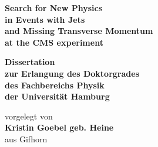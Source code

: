 \documentclass[
twoside=true,
headsepline,     %
headings=normal,
open=right,
numbers=noenddot, %
a4paper
]{scrreprt} %
\author{Matthias Schr\"oder}
\begin{document}
\begin{titlepage}
  \begin{center}
    \thispagestyle{empty}
    \vspace*{1cm}
    \begin{doublespace} 
      \textbf{\huge Search for New Physics}\\
      \textbf{\huge in Events with Jets}\\
      \textbf{\huge and Missing Transverse Momentum}\\
      \textbf{\huge at the CMS experiment} \\
      \vskip1.5cm
      \begin{Large} 
        \textbf{Dissertation\\
          zur Erlangung des Doktorgrades\\
          des Fachbereichs Physik\\
          der Universit\"{a}t Hamburg\\}
      \end{Large}
      \vskip2cm
      \begin{large}
        vorgelegt von\\
        {\bf Kristin Goebel geb. Heine}\\
        aus Gifhorn
        \vfill
      \end{large}
    \end{doublespace} 
  \end{center}
\end{titlepage}


\newpage 
\thispagestyle{empty}
\quad 
\newpage
\thispagestyle{empty}
\end{document}
